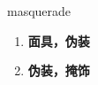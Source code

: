 
\begin{frame}
{\huge masquerade}
\begin{center}
\begin{enumerate}\Large
  \item \textbf{面具，伪装}
  \item \textbf{伪装，掩饰}
\end{enumerate}
\end{center}
\end{frame}
